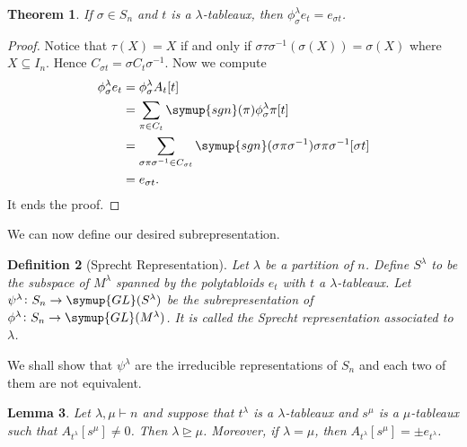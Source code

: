 \documentclass{assignment}[2019/10/15]
\theoremstyle{plain}
\newtheorem{theorem}{Theorem}[section]
\newtheorem{definition}[theorem]{Definition}
\newtheorem{lemma}[theorem]{Lemma}
\newcommand{\GL}{\mathop{}\!\symup{GL}}
\newcommand{\sgn}{\mathop{}\!\symup{sgn}}
\begin{document}
    \begin{theorem}
        If $\sigma\in S_n$ and $t$ is a $\lambda$-tableaux, then $\phi_\sigma^\lambda e_t = e_{\sigma t}$.
    \end{theorem}

    \begin{proof}
        Notice that $\tau(X) = X$ if and only if $\sigma\tau\sigma^{-1}(\sigma(X)) = \sigma(X)$ where $X\subseteq I_n$. Hence $C_{\sigma t}=\sigma C_t\sigma^{-1}$. Now we compute
        \begin{equation}
            \begin{aligned}
                \phi_\sigma^\lambda e_t &= \phi_\sigma^\lambda A_t[t]\\
                &= \sum_{\pi\in C_t}\sgn(\pi)\phi_\sigma^\lambda \pi [t]\\
                &= \sum_{\sigma\pi\sigma^{-1}\in C_{\sigma t}}\sgn(\sigma\pi\sigma^{-1})\sigma\pi\sigma^{-1}[\sigma t]\\
                &= e_{\sigma t}.
            \end{aligned}
        \end{equation}
        It ends the proof.
    \end{proof}

    We can now define our desired subrepresentation.
    \begin{definition}[Sprecht Representation]
        Let $\lambda$ be a partition of $n$. Define $S^\lambda$ to be the subspace of $M^\lambda$ spanned by the polytabloids $e_t$ with $t$ a $\lambda$-tableaux. Let $\psi^\lambda\colon S_n\to \GL(S^\lambda)$ be the subrepresentation of $\phi^\lambda\colon S_n\to \GL(M^\lambda)$. It is called the \emph{Sprecht representation} associated to $\lambda$.
    \end{definition}

    We shall show that $\psi^\lambda$ are the irreducible representations of $S_n$ and each two of them are not equivalent.

    \begin{lemma}\label{lem: Ats}
        Let $\lambda, \mu\vdash n$ and suppose that $t^\lambda$ is a $\lambda$-tableaux and $s^\mu$ is a $\mu$-tableaux such that $A_{t^\lambda}[s^\mu]\neq 0$. Then $\lambda\unrhd\mu$. Moreover, if $\lambda=\mu$, then $A_{t^\lambda}[s^\mu]=\pm e_{t^\lambda}$.
    \end{lemma}
\end{document}
